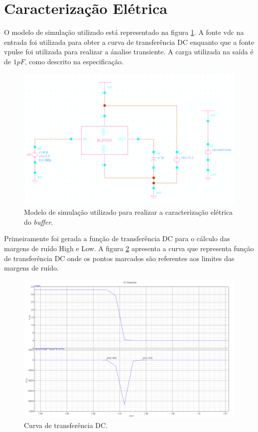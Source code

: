 \documentclass[a4paper,10pt] {article}
\begin{document}
\section{Caracterização Elétrica}
\label{sec:caracterizacao}
O modelo de simulação utilizado está representado na figura \ref{fig:teste}. A fonte vdc na entrada foi utilizada para obter a curva de transferência DC enquanto que a fonte vpulse foi utilizada para realizar a ánalise transiente. A carga utilizada na saída é de $1pF$, como descrito na especificação.

\begin{figure} [h]
	\centering
	\includegraphics[scale=0.15]{teste_buffer.png}
	\caption{Modelo de simulação utilizado para realizar a caracterização elétrica do \textit{buffer}.}
	\label{fig:teste}
\end{figure}

Primeiramente foi gerada a função de transferência DC para o cálculo das margens de ruído High e Low. A figura \ref{fig:dc} apresenta a curva que representa função de transferência DC onde os pontos marcados são referentes aos limites das margens de ruído.

\begin{figure} [h]
	\centering
	\includegraphics[scale=0.1]{DC_Buffer.png}
	\caption{Curva de transferência DC.}
	\label{fig:dc}
\end{figure}
\end{document}
